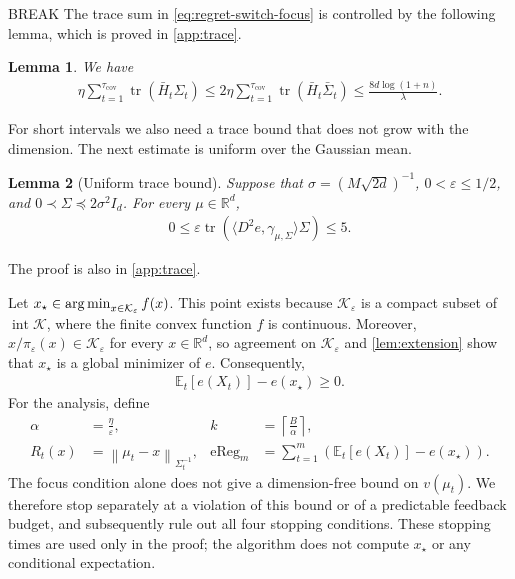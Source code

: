 \documentclass{article}
\newtheorem{lemma}[lemma]{Lemma}
\newcommand{\R}{\mathbb R}
\newcommand{\E}{\mathbb E}
\newcommand{\K}{\mathcal K}
\newcommand{\tr}{\operatorname{tr}}
\newcommand{\argmin}{\operatornamewithlimits{arg\,min}}
\newcommand{\1}{\mathbf 1}
\newcommand{\eps}{\varepsilon}
\newcommand{\normm}[2]{\left\lVert #1\right\rVert_{#2}}
\begin{document}
BREAK
The trace sum in \eqref{eq:regret-switch-focus} is controlled by the following lemma, which is proved in \cref{app:trace}.
\begin{lemma}
    \label{lem:trace}
    We have
    \begin{align}
        \eta\sum_{t=1}^{\tau_{\mathrm{cov}}}
        \tr(\bar{H}_t\Sigma_t)
        \leq
        2\eta\sum_{t=1}^{\tau_{\mathrm{cov}}}
        \tr(\bar{H}_t\bar{\Sigma}_t)
        \leq\frac{8d\log(1 + n)}{\lambda}.
        \label{eq:trace-budget}
    \end{align}
\end{lemma}
For short intervals we also need a trace bound that does not grow with
the dimension. The next estimate is uniform over the Gaussian mean.
\begin{lemma}[Uniform trace bound]
    \label{lem:uniform-trace}
    Suppose that $\sigma=(M\sqrt{2d})^{-1}$, $0<\eps\leq1/2$, and
    $0\prec\Sigma\preceq2\sigma^2I_d$. For every $\mu\in\R^d$,
    \begin{align}
        0\leq\eps\tr\left(
        \langle D^2e,\gamma_{\mu,\Sigma}\rangle\Sigma
        \right)\leq5.
        \label{eq:uniform-trace}
    \end{align}
\end{lemma}
The proof is also in \cref{app:trace}.

Let $x_\star\in\argmin_{x\in\K_\eps}f(x)$.
This point exists because $\K_\eps$ is a compact subset of
$\operatorname{int}\K$, where the finite convex function $f$ is continuous.
Moreover, $x/\pi_\eps(x)\in\K_\eps$ for every $x\in\R^d$, so agreement on
$\K_\eps$ and \cref{lem:extension} show that $x_\star$ is a global
minimizer of $e$. Consequently,
\begin{align}
    \E_t[e(X_t)]-e(x_\star)\geq0.
    \label{eq:stationarity-sign}
\end{align}
For the analysis, define
\begin{align}
    \alpha & =\frac{\eta}{\eps},
           & k                                & =\left\lceil\frac B\alpha\right\rceil,
    \label{eq:analysis-budgets}
    \\
    R_t(x) & =\normm{\mu_t-x}{\Sigma_t^{-1}},
           & \operatorname{eReg}_m            & =\sum_{t=1}^m
    \left(\E_t[e(X_t)]-e(x_\star)\right).
    \label{eq:analysis-potentials}
\end{align}
The focus condition alone does not give a dimension-free bound on
$v(\mu_t)$. We therefore stop separately at a violation of this bound or
of a predictable feedback budget, and subsequently rule out all four
stopping conditions. These stopping times are used only in the proof;
the algorithm does not compute $x_\star$ or any conditional expectation.
\end{document}
